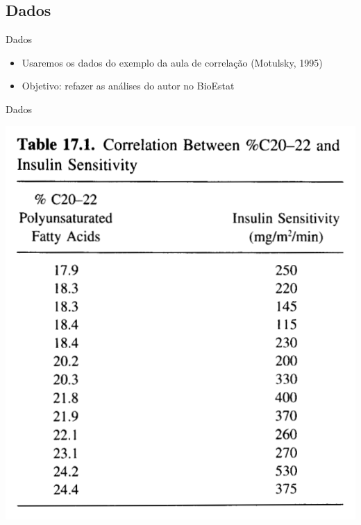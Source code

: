 \documentclass{beamer}
\begin{document}
\subsection{Dados}

\begin{frame}{Dados}
  \begin{itemize}
  \item Usaremos os dados do exemplo da aula de correlação (Motulsky, 1995)
  \item Objetivo: refazer as análises do autor no BioEstat
  \end{itemize}
\end{frame}


\begin{frame}{Dados}
  \begin{center}
    \includegraphics[height=0.9\textheight]{Pratica_Desc/table}
  \end{center}
\end{frame}
\end{document}
